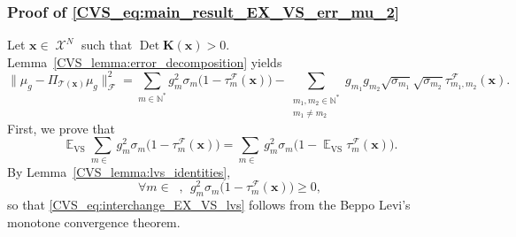 \documentclass[twoside,11pt]{book}
\numberwithin{theorem}{chapter}
\numberwithin{definition}{chapter}
\numberwithin{proposition}{chapter}
\numberwithin{corollary}{chapter}
\numberwithin{example}{chapter}
\numberwithin{lemma}{chapter}
\numberwithin{assumption}{chapter}
\numberwithin{equation}{chapter}
\numberwithin{figure}{chapter}
\DeclareMathOperator{\Det}{Det}
\DeclareMathOperator{\VS}{\mathrm{VS}}
\DeclareMathOperator{\EX}{\mathbb{E}}
\DeclareMathOperator{\F}{\mathcal{F}}
\DeclareMathOperator{\X}{\mathcal{X}}
\DeclareMathOperator{\Ns}{\mathbb{N}^{*}}
\newcommand{\rb}[1]{\textcolor{magenta}{#1}}
\begin{document}
\subsubsection{Proof of \eqref{CVS_eq:main_result_EX_VS_err_mu_2}}
Let $\bm{x} \in \X^{N}$ such that $\Det \bm{K}(\bm{x}) >0 $. Lemma~\ref{CVS_lemma:error_decomposition} yields
\begin{equation}
\|\mu_{g} - \Pi_{\mathcal{T}(\bm{x})} \mu_{g}\|_{\F}^{2}  = \sum\limits_{m \in \mathbb{N}^{*}} g_{m}^{2} \sigma_{m}\bigg(1- \tau_{m}^{\F}(\bm{x})\bigg) - \sum\limits_{\substack{m_{1},m_{2} \in \mathbb{N}^{*} \\ m_{1} \neq m_{2}}}  g_{m_{1}}g_{m_{2}} \sqrt{\sigma_{m_{1}}} \sqrt{\sigma_{m_{2}}} \tau_{m_{1},m_{2}}^{\F}(\bm{x}).
\end{equation}
First, we prove that
\begin{equation}\label{CVS_eq:interchange_EX_VS_lvs}
\EX_{\VS} \sum\limits_{m \in \Ns} g_{m}^{2} \sigma_{m}\bigg(1- \tau_{m}^{\F}(\bm{x})\bigg) = \sum\limits_{m \in \Ns} g_{m}^{2} \sigma_{m}\bigg(1- \EX_{\VS}\tau_{m}^{\F}(\bm{x})\bigg).
\end{equation}
By Lemma~\ref{CVS_lemma:lvs_identities},
\begin{equation}
\forall m \in \Ns, \:\: g_{m}^{2} \sigma_{m}\bigg(1- \tau_{m}^{\F}(\bm{x})\bigg)\geq 0, \label{CVS_e:summable_term}
\end{equation}
so that \eqref{CVS_eq:interchange_EX_VS_lvs} follows from the Beppo Levi's monotone convergence theorem.
\end{document}
